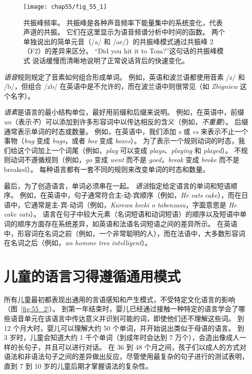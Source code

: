 \begin{figure}[htbp]
	\centering
	\texttt{[image: chap55/fig\_55\_1]}
	\caption{共振峰频率。
	共振峰是各种声音频率下能量集中的系统变化，代表声道的共振。
	它们在这里显示为语音频谱分析中时间的函数。
	两个单独说出的简单元音（/a/ 和 /ae/）的共振峰模式通过共振峰 2（F2）的差异来区分。
	“Did you hit it to Tom?”这句话的共振峰模式 说话缓慢而清晰地说明了正常说话背后的快速变化。}
	\label{fig:55_1}
\end{figure}


\textit{语音}规则规定了音素如何组合形成单词。
例如，英语和波兰语都使用音素 /z/ 和 /b/，但组合 /zb/ 在英语中是不允许的，而在波兰语中则很常见（如 \textit{Zbigniew} 这个名字）。


\textit{语素}是语言的最小结构单位，最好用前缀和后缀来说明。
例如，在英语中，前缀 \textit{un}（表示\textit{不}）可以添加到许多形容词中以传达相反的含义（例如，\textit{不重要}）。
后缀通常表示单词的时态或数量。
例如，在英语中，我们添加 \textit{s} 或 \textit{es} 来表示不止一个事物（\textit{bug} 变成 \textit{bugs}，或者 \textit{box} 变成 \textit{boxes}）。
为了表示一个规则动词的时态，我们给这个词加上一个词尾（例如，\textit{play} 可以变成 \textit{plays}、\textit{playing} 和 \textit{played}）。
不规则动词不遵循规则（例如，\textit{go} 变成 \textit{went} 而不是 \textit{goed}，\textit{break} 变成 \textit{broke} 而不是 breaked）。
每种语言都有一套不同的规则来改变单词的时态和数量。


最后，为了创造语言，单词必须串在一起。
\textit{语法}指定给定语言的单词和短语顺序。
例如，在英语中，句子通常符合主-动-宾顺序（例如，\textit{He eats cake}），而在日语中，它通常是主-宾-动词（例如，\textit{Karewa keeki o tabenzasu}，字面意思是 \textit{He cake eats}）。
语言在句子中较大元素（名词短语和动词短语）的顺序以及短语中单词的顺序方面存在系统差异，如英语和法语名词短语之间的差异所示。
在英语中，形容词在名词之前（例如，一个非常聪明的人），而在法语中，大多数形容词在名词之后（例如，\textit{un homme tres intelligent}）。



\section{儿童的语言习得遵循通用模式}

所有儿童最初都表现出通用的言语感知和产生模式，不受特定文化语言的影响（图~\ref{fig:55_2}）。
到第一年结束时，婴儿已经通过接触一种特定的语言学会了哪些语音单元在该语言中传达意义并识别可能的词，即使他们还不理解这些词。
到 12 个月大时，婴儿可以理解大约 50 个单词，并开始说出类似于母语的语言。
到 3 岁时，儿童会知道大约 1 千个单词（到成年时会达到 7 万个），会造出像成人一样的长句子，并且可以进行对话。
在 36 到 48 个月之间，孩子们以成人的方式对语法和非语法句子之间的差异做出反应，尽管使用最复杂的句子进行的测试表明，直到 7 到 10 岁的儿童后期才掌握语法的复杂性。


